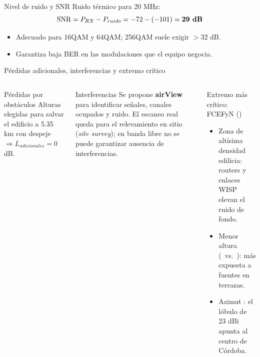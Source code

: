 \begin{frame}{Nivel de ruido y SNR}
  Ruido térmico para 20 MHz: \EAruido
  \[
    \text{SNR} = P_{RX} - P_{ruido} = -72 - (-101) = \textbf{29 dB}
  \]
  \begin{itemize}
    \item Adecuado para 16QAM y 64QAM; 256QAM suele exigir $>$32 dB.
    \item Garantiza baja BER en las modulaciones que el equipo negocia.
  \end{itemize}
  \vspace{4pt}
  \begin{center}
  \end{center}
\end{frame}

\begin{frame}{Pérdidas adicionales, interferencias y extremo crítico}
  \begin{columns}[T]
    \begin{block}{Pérdidas por obstáculos}
      \small Alturas elegidas para salvar el edificio a 5.35 km con despeje \EAdespejePct\
      $\Rightarrow L_{adicionales}=0$ dB.
    \end{block}
    \begin{block}{Interferencias}
      \small Se propone \textbf{airView} para identificar señales, canales ocupados y ruido.
      El escaneo real queda para el relevamiento en sitio (\emph{site survey}); en banda libre
      no se puede garantizar ausencia de interferencias.
    \end{block}
    \begin{alertblock}{Extremo más crítico: FCEFyN (\EAunoAlt)}
      \small
      \begin{itemize}
        \item Zona de altísima densidad edilicia: routers y enlaces WISP elevan el ruido de fondo.
        \item Menor altura (\EAunoAlt\ vs.\ \EAdosAlt): más expuesta a fuentes en terrazas.
        \item Azimut \EAazUnoDos: el lóbulo de 23 dBi apunta al centro de Córdoba.
      \end{itemize}
    \end{alertblock}
  \end{columns}
\end{frame}


